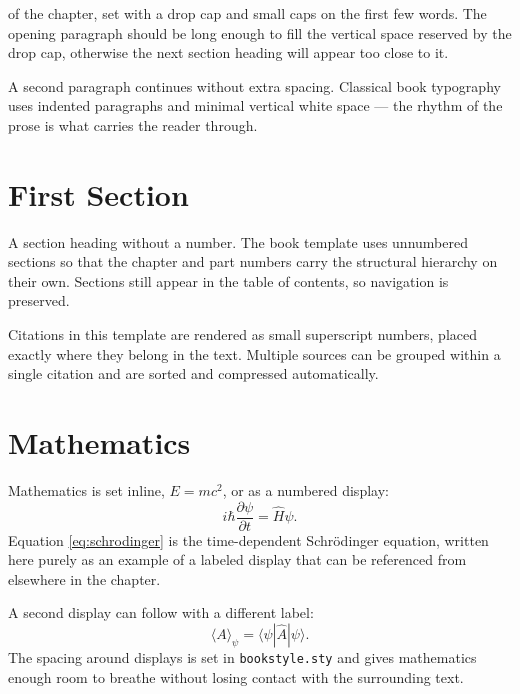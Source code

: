 
of the chapter, set with a drop cap and small caps on the
first few words. The opening paragraph should be long enough
to fill the vertical space reserved by the drop cap, otherwise
the next section heading will appear too close to it.

A second paragraph continues without extra spacing. Classical
book typography uses indented paragraphs and minimal vertical
white space --- the rhythm of the prose is what carries the
reader through.


\section{First Section}

A section heading without a number. The book template uses
unnumbered sections so that the chapter and part numbers
carry the structural hierarchy on their own. Sections still
appear in the table of contents, so navigation is preserved.

Citations in this template are rendered as small superscript
numbers, placed exactly where they belong in the text\cite{example-article}.
Multiple sources can be grouped within a single citation
and are sorted and compressed automatically\cite{example-article,example-book}.


\section{Mathematics}

Mathematics is set inline, $E = mc^2$, or as a numbered
display:
\begin{equation}
  i\hbar \frac{\partial \psi}{\partial t}
  = \hat{H}\psi.
  \label{eq:schrodinger}
\end{equation}
Equation \eqref{eq:schrodinger} is the time-dependent
Schr\"odinger equation, written here purely as an example
of a labeled display that can be referenced from elsewhere
in the chapter.

A second display can follow with a different label:
\begin{equation}
  \langle A \rangle_\psi = \langle \psi | \hat{A} | \psi \rangle.
  \label{eq:expectation}
\end{equation}
The spacing around displays is set in \texttt{bookstyle.sty}
and gives mathematics enough room to breathe without losing
contact with the surrounding text.

